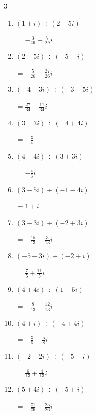\begin{multicols}{3}
\begin{enumerate}
  \item $\displaystyle (1+i)\div(2-5i)$

        $\displaystyle =-\frac{3}{29}+\frac{7}{29}i$

  \item $\displaystyle (2-5i)\div(-5-i)$

        $\displaystyle =-\frac{5}{26}+\frac{27}{26}i$

  \item $\displaystyle (-4-3i)\div(-3-5i)$

        $\displaystyle =\frac{27}{34}-\frac{11}{34}i$

  \item $\displaystyle (3-3i)\div(-4+4i)$

        $\displaystyle =-\frac{3}{4}$

\columnbreak %

  \item $\displaystyle (4-4i)\div(3+3i)$

        $\displaystyle =-\frac{4}{3}i$

  \item $\displaystyle (3-5i)\div(-1-4i)$

        $\displaystyle =1+i$

  \item $\displaystyle (3-3i)\div(-2+3i)$

        $\displaystyle =-\frac{15}{13}-\frac{3}{13}i$

  \item $\displaystyle (-5-3i)\div(-2+i)$

        $\displaystyle =\frac{7}{5}+\frac{11}{5}i$

  \item $\displaystyle (4+4i)\div(1-5i)$

        $\displaystyle =-\frac{8}{13}+\frac{12}{13}i$

  \item $\displaystyle (4+i)\div(-4+4i)$

        $\displaystyle =-\frac{3}{8}-\frac{5}{8}i$

  \item $\displaystyle (-2-2i)\div(-5-i)$

        $\displaystyle =\frac{6}{13}+\frac{4}{13}i$

  \item $\displaystyle (5+4i)\div(-5+i)$

        $\displaystyle =-\frac{21}{26}-\frac{25}{26}i$


\end{enumerate}
\end{multicols}
